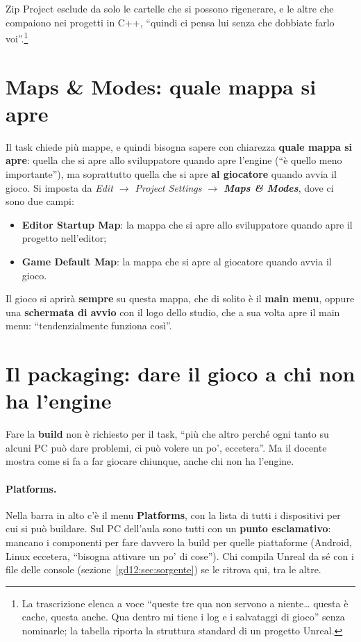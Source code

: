 Zip Project esclude da solo le cartelle che si possono rigenerare, e le altre
che compaiono nei progetti in C++, ``quindi ci pensa lui senza che dobbiate farlo
voi''.\footnote{La trascrizione elenca a voce ``queste tre qua non servono a
niente\dots{} questa è cache, questa anche. Qua dentro mi tiene i log e i
salvataggi di gioco'' senza nominarle; la tabella riporta la struttura standard
di un progetto Unreal.}

\section{Maps \& Modes: quale mappa si apre}
\label{gd12:sec:maps-modes}

Il task chiede più mappe, e quindi bisogna sapere con chiarezza \textbf{quale
mappa si apre}: quella che si apre allo sviluppatore quando apre l'engine
(``è quello meno importante''), ma soprattutto quella che si apre \textbf{al
giocatore} quando avvia il gioco. Si imposta da \emph{Edit $\rightarrow$
Project Settings $\rightarrow$ \textbf{Maps \& Modes}}, dove ci sono due campi:
\begin{itemize}
  \item \textbf{Editor Startup Map}: la mappa che si apre allo sviluppatore
        quando apre il progetto nell'editor;
  \item \textbf{Game Default Map}: la mappa che si apre al giocatore quando
        avvia il gioco.
\end{itemize}
Il gioco si aprirà \textbf{sempre} su questa mappa, che di solito è il
\textbf{main menu}, oppure una \textbf{schermata di avvio} con il logo dello
studio, che a sua volta apre il main menu: ``tendenzialmente funziona così''.

\section{Il packaging: dare il gioco a chi non ha l'engine}
\label{gd12:sec:packaging}

Fare la \textbf{build} non è richiesto per il task, ``più che altro perché ogni
tanto su alcuni PC può dare problemi, ci può volere un po', eccetera''. Ma il
docente mostra come si fa a far giocare chiunque, anche chi non ha l'engine.

\paragraph{Platforms.} Nella barra in alto c'è il menu \textbf{Platforms}, con
la lista di tutti i dispositivi per cui si può buildare. Sul PC dell'aula sono
tutti con un \textbf{punto esclamativo}: mancano i componenti per fare davvero
la build per quelle piattaforme (Android, Linux eccetera, ``bisogna attivare un
po' di cose''). Chi compila Unreal da sé con i file delle console
(sezione~\ref{gd12:sec:sorgente}) se le ritrova qui, tra le altre.

